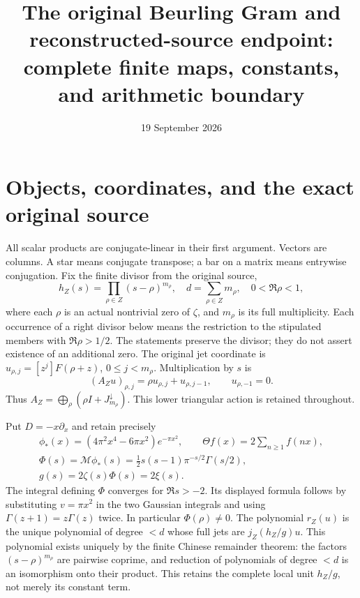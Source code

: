 \documentclass[11pt]{article}
\title{The original Beurling Gram and reconstructed-source endpoint:\\complete finite maps, constants, and arithmetic boundary}
\date{19 September 2026}
\newcommand{\M}{\mathcal M}\newcommand{\G}{\mathsf G}
\begin{document}
\maketitle

\section{Objects, coordinates, and the exact original source}\label{sec:objects}
All scalar products are conjugate-linear in their first argument. Vectors
are columns. A star means conjugate transpose; a bar on a matrix means
entrywise conjugation. Fix the finite divisor from the original source,
\[
 h_Z(s)=\prod_{\rho\in Z}(s-\rho)^{m_\rho},\quad
 d=\sum_{\rho\in Z}m_\rho,\quad 0<\Re\rho<1,
\]
where each $\rho$ is an actual nontrivial zero of $\zeta$, and $m_\rho$
is its full multiplicity. Each occurrence of a right divisor below means
the restriction to the stipulated members with $\Re\rho>1/2$. The
statements preserve the divisor; they do not assert existence of an
additional zero. The original jet coordinate is
$u_{\rho,j}=[z^j]F(\rho+z)$, $0\le j<m_\rho$. Multiplication by $s$ is
\[
 (A_Zu)_{\rho,j}=\rho u_{\rho,j}+u_{\rho,j-1},\qquad u_{\rho,-1}=0.
 \tag{EG1}\label{eq:jet-action}
\]
Thus $A_Z=\bigoplus_\rho(\rho I+J^\downarrow_{m_\rho})$.
This lower triangular action is retained throughout.

Put $D=-x\partial_x$ and retain precisely
\[
 \begin{gathered}
 \phi_*(x)=(4\pi^2x^4-6\pi x^2)e^{-\pi x^2},\qquad
 \Theta f(x)=2\sum_{n\ge1}f(nx),\\
 \Phi(s)=\M\phi_*(s)=\tfrac12s(s-1)\pi^{-s/2}\Gamma(s/2),\\
 g(s)=2\zeta(s)\Phi(s)=2\xi(s).
 \end{gathered}
 \tag{EG2}\label{eq:source}
\]
The integral defining $\Phi$ converges for $\Re s>-2$. Its displayed
formula follows by substituting $v=\pi x^2$ in the two Gaussian
integrals and using $\Gamma(z+1)=z\Gamma(z)$ twice. In particular
$\Phi(\rho)\ne0$. The polynomial $r_Z(u)$ is the unique polynomial of
degree $<d$ whose full jets are $j_Z(h_Z/g)u$. This polynomial exists
uniquely by the finite Chinese remainder theorem: the factors
$(s-\rho)^{m_\rho}$ are pairwise coprime, and reduction of polynomials
of degree $<d$ is an isomorphism onto their product. This retains the
complete local unit $h_Z/g$, not merely its constant term.
\end{document}
